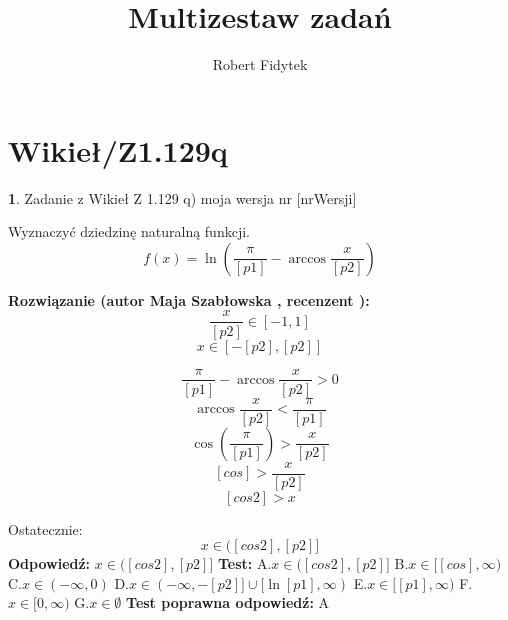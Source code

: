 \documentclass[12pt, a4paper]{article}
\title{Multizestaw zadań}
\author{Robert Fidytek}
\date{}
\theoremstyle{definition} %
\newtheorem{zad}{}
\newcommand{\kategoria}[1]{\section{#1}} %
\newcommand{\zadStart}[1]{\begin{zad}#1\newline} %
\newcommand{\zadStop}{\end{zad}}   %
\newcommand{\rozwStart}[2]{\noindent \textbf{Rozwiązanie (autor #1 , recenzent #2): }\newline} %
\newcommand{\rozwStop}{\newline}                                            %
\newcommand{\odpStart}{\noindent \textbf{Odpowiedź:}\newline}    %
\newcommand{\odpStop}{\newline}                                             %
\newcommand{\testStart}{\noindent \textbf{Test:}\newline} %
\newcommand{\testStop}{\newline} %
\newcommand{\kluczStart}{\noindent \textbf{Test poprawna odpowiedź:}\newline} %
\newcommand{\kluczStop}{\newline} %
\begin{document}
\maketitle


\kategoria{Wikieł/Z1.129q}
\zadStart{Zadanie z Wikieł Z 1.129 q) moja wersja nr [nrWersji]}



Wyznaczyć dziedzinę naturalną funkcji.
$$f(x)=\ln\left(\frac{\pi}{[p1]}-\arccos\frac{x}{[p2]}\right)$$
\zadStop

\rozwStart{Maja Szabłowska}{}
$$\frac{x}{[p2]} \in [-1,1]$$
$$x\in[-[p2],[p2]]$$

$$\frac{\pi}{[p1]}-\arccos\frac{x}{[p2]}>0$$
$$\arccos\frac{x}{[p2]}<\frac{\pi}{[p1]}$$
$$\cos\left(\frac{\pi}{[p1]}\right)>\frac{x}{[p2]}$$
$$[cos]>\frac{x}{[p2]}$$
$$[cos2]>x$$

Ostatecznie:
$$x\in([cos2], [p2]]$$
\rozwStop
\odpStart
$x\in([cos2], [p2]]$
\odpStop
\testStart
A.$x\in([cos2], [p2]]$
B.$x\in[[cos],\infty)$
C.$x\in(-\infty, 0)$
D.$x\in(-\infty, -[p2]] \cup [\ln[p1],\infty)$
E.$x\in[[p1],\infty)$
F.$x\in[0,\infty)$
G.$x\in\emptyset$
\testStop
\kluczStart
A
\kluczStop
\end{document}
